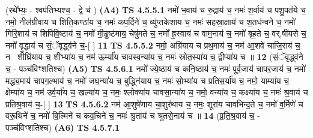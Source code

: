 \documentclass[17pt]{extarticle}
\begin{document}
                  \newline
                      (रथे᳚भ्यः॒ - श्वप॑तिभ्यश्च॒ - द्वे च॑ )  \textbf{(A4)} \newline \newline
                                        \textbf{ TS 4.5.5.1} \newline
                  नमो॑ भ॒वाय॑ च रु॒द्राय॑ च॒ नमः॑ श॒र्वाय॑ च पशु॒पत॑ये च॒ नमो॒ नील॑ग्रीवाय च शिति॒कण्ठा॑य च॒ नमः॑ कप॒र्दिने॑ च॒ व्यु॑प्तकेशाय च॒ नमः॑ सहस्रा॒क्षाय॑ च श॒तध॑न्वने च॒ नमो॑ गिरि॒शाय॑ च शिपिवि॒ष्टाय॑ च॒ नमो॑ मी॒ढुष्ट॑माय॒ चेषु॑मते च॒ नमो᳚ ह्र॒स्वाय॑ च वाम॒नाय॑ च॒ नमो॑ बृह॒ते च॒ वर्.षी॑यसे च॒ नमो॑ वृ॒द्धाय॑ च सं॒ॅवृद्ध्व॑ने च॒-[  ] \textbf{  11} \newline
                  \newline
                                \textbf{ TS 4.5.5.2} \newline
                  नमो॒ अग्रि॑याय च प्रथ॒माय॑ च॒ नम॑ आ॒शवे॑ चाजि॒राय॑ च॒ नमः᳡शीघ्रि॑याय च॒ शीभ्या॑य च॒ नम॑ ऊ॒र्म्या॑य चावस्व॒न्या॑य च॒ नमः॑ स्रोत॒स्या॑य च॒ द्वीप्या॑य च ॥ \textbf{  12 } \newline
                  \newline
                      (सं॒ॅवृद्ध्व॑ने च॒ - पञ्च॑विꣳशतिश्च)  \textbf{(A5)} \newline \newline
                                        \textbf{ TS 4.5.6.1} \newline
                  नमो᳚ ज्ये॒ष्ठाय॑ च कनि॒ष्ठाय॑ च॒ नमः॑ पूर्व॒जाय॑ चापर॒जाय॑ च॒ नमो॑ मद्ध्य॒माय॑ चापग॒ल्भाय॑ च॒ नमो॑ जघ॒न्या॑य च॒ बुद्ध्नि॑याय च॒ नमः॑ सो॒भ्या॑य च प्रतिस॒र्या॑य च॒ नमो॒ याम्या॑य च॒ क्षेम्या॑य च॒ नम॑ उर्व॒र्या॑य च॒ खल्या॑य च॒ नमः॒ श्लोक्या॑य चावसा॒न्या॑य च॒ नमो॒ वन्या॑य च॒ कक्ष्या॑य च॒ नमः॑ श्र॒वाय॑ च प्रतिश्र॒वाय॑ च॒-[  ] \textbf{  13} \newline
                  \newline
                                \textbf{ TS 4.5.6.2} \newline
                  नम॑ आ॒शुषे॑णाय चा॒शुर॑थाय च॒ नमः॒ शूरा॑य चावभिन्द॒ते च॒ नमो॑ व॒र्मिणे॑ च वरू॒थिने॑ च॒ नमो॑ बि॒ल्मिने॑ च कव॒चिने॑ च॒ नमः॑ श्रु॒ताय॑ च श्रुतसे॒नाय॑ च ॥ \textbf{  14} \newline
                  \newline
                      (प्र॒ति॒श्र॒वाय॑ च॒ - पञ्च॑विꣳशतिश्च)  \textbf{(A6)} \newline \newline
                                        \textbf{ TS 4.5.7.1} \newline
\end{document}
